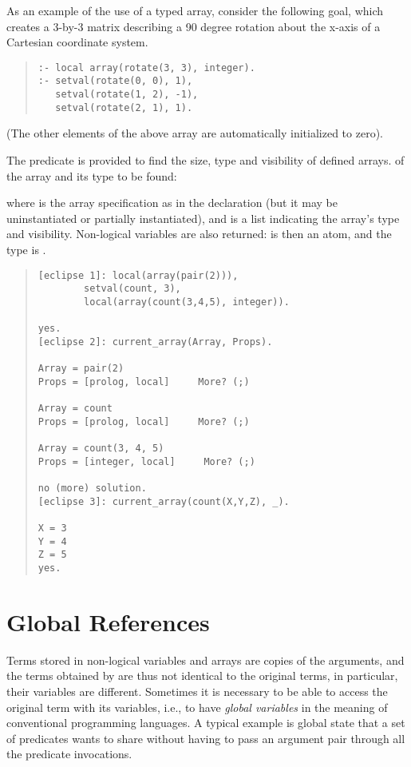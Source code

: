 As an example of the use of a typed array, consider the following goal, which
creates a 3-by-3 matrix describing a 90 degree rotation about the x-axis of
a Cartesian coordinate system.
\begin{quote}
\begin{verbatim}
:- local array(rotate(3, 3), integer).
:- setval(rotate(0, 0), 1),
   setval(rotate(1, 2), -1),
   setval(rotate(2, 1), 1).
\end{verbatim}
\end{quote}
(The other elements of the above array are automatically initialized to zero).

The predicate
is provided to find the size, type and visibility of defined arrays.
of the array and its type to be found:
\begin{quote}
\end{quote}
where  is the array specification as in the declaration (but it
may be uninstantiated or partially instantiated), and  is
a list indicating the array's type and visibility.
Non-logical variables are also returned:  is then an atom, and
the type is .
\begin{quote}
\begin{verbatim}
[eclipse 1]: local(array(pair(2))),
        setval(count, 3),
        local(array(count(3,4,5), integer)).

yes.
[eclipse 2]: current_array(Array, Props).

Array = pair(2)
Props = [prolog, local]     More? (;)

Array = count
Props = [prolog, local]     More? (;)

Array = count(3, 4, 5)
Props = [integer, local]     More? (;)

no (more) solution.
[eclipse 3]: current_array(count(X,Y,Z), _).

X = 3
Y = 4
Z = 5
yes.
\end{verbatim}
\end{quote}


\section{Global References}
\label{globrefs}
Terms stored in non-logical variables and arrays are copies of the
 arguments,
and the terms obtained by
 are thus not identical
to the original terms, in particular, their variables are different.
Sometimes it is necessary to be able
to access the original term with its variables, i.e., to have
\emph{global variables} in the meaning of conventional programming
languages.
A typical example is global state that a set of predicates wants to
share without having to pass an argument pair through all the
predicate invocations.

